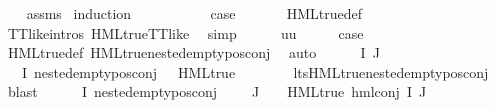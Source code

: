 \begin{isabellebody}
%
\isadelimproof
\ \ %
\endisadelimproof
%
\isatagproof
{}\isamarkupfalse%
\ assms\ \isamarkupfalse%
{\isacharparenleft}{\kern0pt}induction\ {\isasymphi}{\isacharparenright}{\kern0pt}\isanewline
\ \ \isamarkupfalse%
\ {}\isanewline
\ \ \isamarkupfalse%
\ \isamarkupfalse%
\ {\isacharquery}{\kern0pt}case\ \isanewline
\ \ \ \ \isamarkupfalse%
\ HML{\isacharunderscore}{\kern0pt}true{\isacharunderscore}{\kern0pt}def\isanewline
\ \ \ \ \isamarkupfalse%
\ TT{\isacharunderscore}{\kern0pt}like{\isachardot}{\kern0pt}intros{\isacharparenleft}{\kern0pt}{}{\isacharparenright}{\kern0pt}\ HML{\isacharunderscore}{\kern0pt}true{\isacharunderscore}{\kern0pt}TT{\isacharunderscore}{\kern0pt}like\ \isamarkupfalse%
\ simp\isanewline
{}\isamarkupfalse%
\isanewline
\ \ \isamarkupfalse%
\ {\isacharparenleft}{\kern0pt}{}\ {\isasympsi}\ uu{\isacharparenright}{\kern0pt}\isanewline
\ \ \isamarkupfalse%
\ \isamarkupfalse%
\ {\isacharquery}{\kern0pt}case\ \isanewline
\ \ \ \ \isamarkupfalse%
\ HML{\isacharunderscore}{\kern0pt}true{\isacharunderscore}{\kern0pt}def\ HML{\isacharunderscore}{\kern0pt}true{\isacharunderscore}{\kern0pt}nested{\isacharunderscore}{\kern0pt}empty{\isacharunderscore}{\kern0pt}pos{\isacharunderscore}{\kern0pt}conj\ \isamarkupfalse%
\ auto\isanewline
{}\isamarkupfalse%
\isanewline
\ \ \isamarkupfalse%
\ {\isacharparenleft}{\kern0pt}{}\ {\isasymPhi}\ I\ J{\isacharparenright}{\kern0pt}\isanewline
\ \ \isamarkupfalse%
\ {\isachardoublequoteopen}{\isacharparenleft}{\kern0pt}{\isasymforall}{\isasympsi}{\isasymin}{\isasymPhi}\ {\isacharbackquote}{\kern0pt}\ I{\isachardot}{\kern0pt}\ nested{\isacharunderscore}{\kern0pt}empty{\isacharunderscore}{\kern0pt}pos{\isacharunderscore}{\kern0pt}conj\ {\isasympsi}\ {\isasymlongrightarrow}\ HML{\isacharunderscore}{\kern0pt}true\ {\isasympsi}{\isacharparenright}{\kern0pt}{\isachardoublequoteclose}\ \isanewline
\ \ \ \ \isamarkupfalse%
\ lts{\isachardot}{\kern0pt}HML{\isacharunderscore}{\kern0pt}true{\isacharunderscore}{\kern0pt}nested{\isacharunderscore}{\kern0pt}empty{\isacharunderscore}{\kern0pt}pos{\isacharunderscore}{\kern0pt}conj\ \isamarkupfalse%
\ blast\isanewline
\ \ \isamarkupfalse%
\ {\isachardoublequoteopen}{\isacharparenleft}{\kern0pt}{\isacharparenleft}{\kern0pt}{\isasymforall}{\isasympsi}{\isasymin}{\isasymPhi}\ {\isacharbackquote}{\kern0pt}\ I{\isachardot}{\kern0pt}\ nested{\isacharunderscore}{\kern0pt}empty{\isacharunderscore}{\kern0pt}pos{\isacharunderscore}{\kern0pt}conj\ {\isasympsi}{\isacharparenright}{\kern0pt}\ {\isasymand}\ {\isasymPhi}\ {\isacharbackquote}{\kern0pt}\ J\ {\isacharequal}{\kern0pt}\ {\isacharbraceleft}{\kern0pt}{\isacharbraceright}{\kern0pt}{\isacharparenright}{\kern0pt}\ {\isasymlongrightarrow}\ HML{\isacharunderscore}{\kern0pt}true\ {\isacharparenleft}{\kern0pt}hml{\isacharunderscore}{\kern0pt}conj\ I\ J\ {\isasymPhi}{\isacharparenright}{\kern0pt}{\isachardoublequoteclose}\isanewline

\end{isabellebody}
